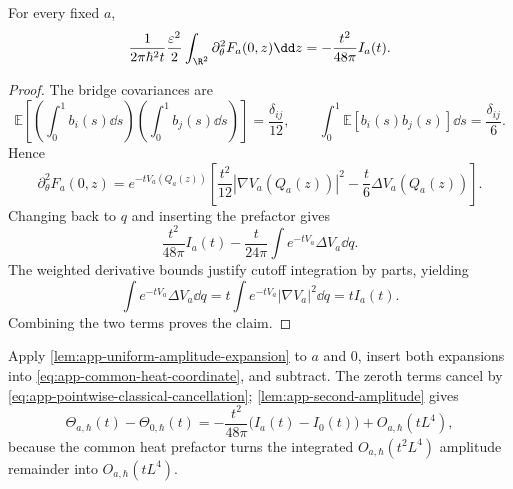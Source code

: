 \begin{lemma}
\label{lem:app-second-amplitude}
For every fixed \(a\),
\begin{equation}
 \frac1{2\pi\hbar^2t}\frac{\varepsilon^2}{2}
 \int_{\R^2}\partial_\theta^2F_a(0,z)\dd z
 =-\frac{t^2}{48\pi}I_a(t).
 \label{eq:app-second-amplitude-coefficient}
\end{equation}
\end{lemma}

\begin{proof}
The bridge covariances are
\begin{equation}
 \mathbb E\!\left[\left(\int_0^1b_i(s)\dd s\right)
 \left(\int_0^1b_j(s)\dd s\right)\right]=\frac{\delta_{ij}}{12},
 \qquad
 \int_0^1\mathbb E[b_i(s)b_j(s)]\dd s=\frac{\delta_{ij}}6.
\end{equation}
Hence
\begin{equation}
 \partial_\theta^2F_a(0,z)
 =e^{-tV_a(Q_a(z))}\left[
 \frac{t^2}{12}|\nabla V_a(Q_a(z))|^2
 -\frac t6\Delta V_a(Q_a(z))\right].
\end{equation}
Changing back to \(q\) and inserting the prefactor gives
\begin{equation}
 \frac{t^2}{48\pi}I_a(t)
 -\frac{t}{24\pi}\int e^{-tV_a}\Delta V_a\dd q.
\end{equation}
The weighted derivative bounds justify cutoff integration by parts, yielding
\begin{equation}
 \int e^{-tV_a}\Delta V_a\dd q
 =t\int e^{-tV_a}|\nabla V_a|^2\dd q=tI_a(t).
\end{equation}
Combining the two terms proves the claim.
\end{proof}

Apply \cref{lem:app-uniform-amplitude-expansion} to \(a\) and \(0\), insert
both expansions into \cref{eq:app-common-heat-coordinate}, and subtract.
The zeroth terms cancel by
\cref{eq:app-pointwise-classical-cancellation};
\cref{lem:app-second-amplitude} gives
\begin{equation}
 \Theta_{a,\hbar}(t)-\Theta_{0,\hbar}(t)
 =-\frac{t^2}{48\pi}\bigl(I_a(t)-I_0(t)\bigr)
 +O_{a,\hbar}(tL^4),
 \label{eq:app-relative-heat-remainder-final}
\end{equation}
because the common heat prefactor turns the integrated
\(O_{a,\hbar}(t^2L^4)\) amplitude remainder into
\(O_{a,\hbar}(tL^4)\).

